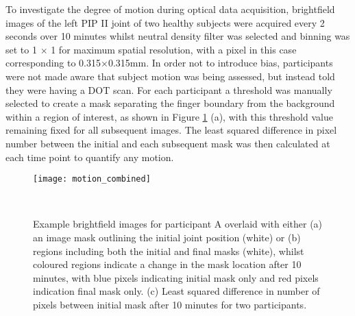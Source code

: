 \documentclass[twoside]{bhamthesis}
\theoremstyle{definition}
\begin{document}
To investigate the degree of motion during optical data acquisition, brightfield images of the left PIP II joint of two healthy subjects were acquired every 2 seconds over 10 minutes whilst neutral density filter was selected and binning was set to 1 $\times$ 1 for maximum spatial resolution, with a pixel in this case corresponding to 0.315$\times$0.315mm. In order not to introduce bias, participants were not made aware that subject motion was being assessed, but instead told they were having a DOT scan. For each participant a threshold was manually selected to create a mask separating the finger boundary from the background within a region of interest, as shown in Figure \ref{fig:Motion_masks} (a), with this threshold value remaining fixed for all subsequent images. The least squared difference in pixel number between the initial and each subsequent mask was then calculated at each time point to quantify any motion.

\begin{figure}[!ht]
\texttt{[image: motion\_combined]}
\centering
\caption{Example brightfield images for participant A overlaid with either (a) an image mask outlining the initial joint position (white) or (b) regions including both the initial and final masks (white), whilst coloured regions indicate a change in the mask location after 10 minutes, with blue pixels indicating initial mask only and red pixels indication final mask only. (c) Least squared difference in number of pixels between initial mask after 10 minutes for two participants.}
  \label{fig:Motion_masks}\
\end{figure}
\end{document}
